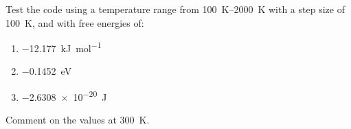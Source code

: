 \documentclass[a4paper]{article}
\begin{document}
Test the code using a temperature range from \SIrange{100}{2000}{\kelvin} with a step size of \SI{100}{\kelvin}, and with free energies of:
\begin{enumerate}
	\item{\SI{-12.177}{\kilo\joule\per\mol}}
	\item{\SI{-0.1452}{\eV}}
	\item{\SI{-2.6308e-20}{\joule}}
\end{enumerate}
Comment on the values at \SI{300}{\kelvin}.



\end{document}
